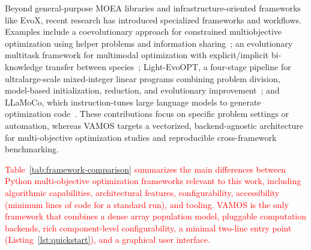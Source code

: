 \documentclass[journal]{IEEEtran}
\newcommand{\VAMOS}{VAMOS}
\begin{document}
 Beyond general-purpose MOEA libraries and infrastructure-oriented frameworks like EvoX, recent research has introduced specialized frameworks and workflows. Examples include a coevolutionary approach for constrained multiobjective optimization using helper problems and information sharing~\cite{TZX+21}; an evolutionary multitask framework for multimodal optimization with explicit/implicit bi-knowledge transfer between species~\cite{ZNL+26}; Light-EvoOPT, a four-stage pipeline for ultralarge-scale mixed-integer linear programs combining problem division, model-based initialization, reduction, and evolutionary improvement~\cite{YXC26}; and LLaMoCo, which instruction-tunes large language models to generate optimization code~\cite{MGG+26}. These contributions focus on specific problem settings or automation, whereas \VAMOS{} targets a vectorized, backend-agnostic architecture for multi-objective optimization studies and reproducible cross-framework benchmarking.

\textcolor{red}{Table~\ref{tab:framework-comparison} summarizes the main differences between Python multi-objective optimization frameworks relevant to this work, including algorithmic capabilities, architectural features, configurability, accessibility (minimum lines of code for a standard run), and tooling. \VAMOS{} is the only framework that combines a dense array population model, pluggable computation backends, rich component-level configurability, a minimal two-line entry point (Listing~\ref{lst:quickstart}), and a graphical user interface.}
\end{document}
